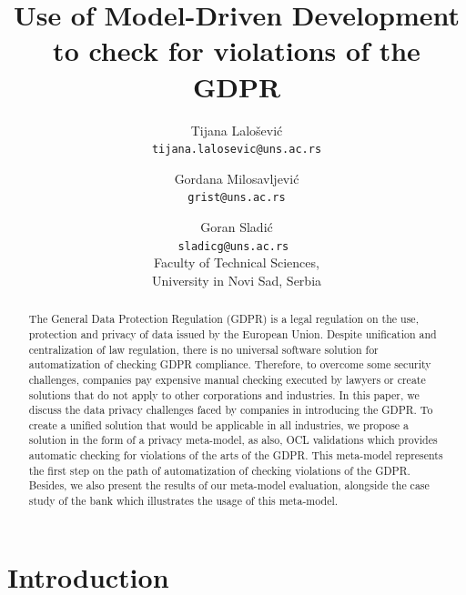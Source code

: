 \documentclass[11pt,english]{article}
\begin{document}
\title{Use of Model-Driven Development to check for violations of the GDPR}
\author{
  Tijana Lalošević\\
  \texttt{tijana.lalosevic@uns.ac.rs}
  \and
  Gordana Milosavljević\\
  \texttt{grist@uns.ac.rs}
  \and
  Goran Sladić\\
  \texttt{sladicg@uns.ac.rs }
  \\Faculty of Technical Sciences,\\ University in Novi Sad, Serbia
}


\date{}
\maketitle


\begin{abstract}
The General Data Protection Regulation (GDPR) is a legal regulation on the use, protection and privacy of data issued by the European Union. Despite unification and centralization of law regulation, there is no universal software solution for automatization of checking GDPR compliance. Therefore, to overcome some security challenges, companies pay expensive manual checking executed by lawyers or create solutions that do not apply to other corporations and industries. In this paper, we discuss the data privacy challenges faced by companies in introducing the GDPR. To create a unified solution that would be applicable in all industries, we propose a solution in the form of a privacy meta-model, as also, OCL validations which provides automatic checking for violations of the arts of the GDPR. This meta-model represents the first step on the path of automatization of checking violations of the GDPR. Besides, we also present the results of our meta-model evaluation, alongside the case study of the bank which illustrates the usage of this meta-model.
\end{abstract}

\section{Introduction}
\end{document}
